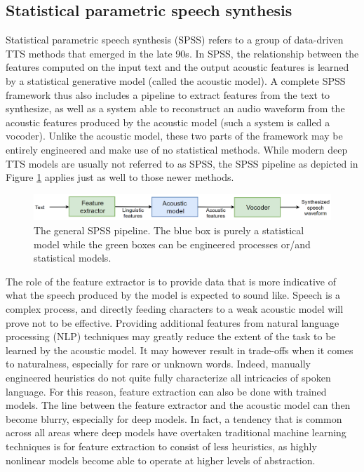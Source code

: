 \documentclass[a4paper, oneside, 12pt, english]{article}
\begin{document}
\subsection{Statistical parametric speech synthesis} \label{SPSS}
Statistical parametric speech synthesis (SPSS) refers to a group of data-driven TTS methods that emerged in the late 90s. In SPSS, the relationship between the features computed on the input text and the output acoustic features is learned by a statistical generative model (called the acoustic model). A complete SPSS framework thus also includes a pipeline to extract features from the text to synthesize, as well as a system able to reconstruct an audio waveform from the acoustic features produced by the acoustic model (such a system is called a vocoder). Unlike the acoustic model, these two parts of the framework may be entirely engineered and make use of no statistical methods. While modern deep TTS models are usually not referred to as SPSS, the SPSS pipeline as depicted in Figure \ref{spss_framework} applies just as well to those newer methods.

\begin{figure}[h]
	\centering
	\includegraphics[width=\linewidth]{images/spss_framework.png}
	\caption{The general SPSS pipeline. The blue box is purely a statistical model while the green boxes can be engineered processes or/and statistical models.}
	\label{spss_framework}
\end{figure}

The role of the feature extractor is to provide data that is more indicative of what the speech produced by the model is expected to sound like. Speech is a complex process, and directly feeding characters to a weak acoustic model will prove not to be effective. Providing additional features from natural language processing (NLP) techniques may greatly reduce the extent of the task to be learned by the acoustic model. It may however result in trade-offs when it comes to naturalness, especially for rare or unknown words. Indeed, manually engineered heuristics do not quite fully characterize all intricacies of spoken language. For this reason, feature extraction can also be done with trained models. The line between the feature extractor and the acoustic model can then become blurry, especially for deep models. In fact, a tendency that is common across all areas where deep models have overtaken traditional machine learning techniques is for feature extraction to consist of less heuristics, as highly nonlinear models become able to operate at higher levels of abstraction.
\end{document}
